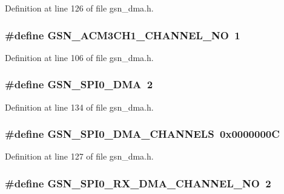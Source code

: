 Definition at line 126 of file gsn\_\-dma.h.

\hypertarget{a00484_a2b2db8ce0a5e10a4826bce61e6b673d5}{
\subsubsection[{GSN\_\-ACM3CH1\_\-CHANNEL\_\-NO}]{\setlength{\rightskip}{0pt plus 5cm}\#define GSN\_\-ACM3CH1\_\-CHANNEL\_\-NO~1}}
\label{a00484_a2b2db8ce0a5e10a4826bce61e6b673d5}


Definition at line 106 of file gsn\_\-dma.h.

\hypertarget{a00484_a90eb18824f9b1b14a6e642364c002099}{
\subsubsection[{GSN\_\-SPI0\_\-DMA}]{\setlength{\rightskip}{0pt plus 5cm}\#define GSN\_\-SPI0\_\-DMA~2}}
\label{a00484_a90eb18824f9b1b14a6e642364c002099}


Definition at line 134 of file gsn\_\-dma.h.

\hypertarget{a00484_a518ed5af9857de8db4ce3248328e9c6b}{
\subsubsection[{GSN\_\-SPI0\_\-DMA\_\-CHANNELS}]{\setlength{\rightskip}{0pt plus 5cm}\#define GSN\_\-SPI0\_\-DMA\_\-CHANNELS~0x0000000C}}
\label{a00484_a518ed5af9857de8db4ce3248328e9c6b}


Definition at line 127 of file gsn\_\-dma.h.

\hypertarget{a00484_a09c49cb5be2c0afcec8a685ed3679134}{
\subsubsection[{GSN\_\-SPI0\_\-RX\_\-DMA\_\-CHANNEL\_\-NO}]{\setlength{\rightskip}{0pt plus 5cm}\#define GSN\_\-SPI0\_\-RX\_\-DMA\_\-CHANNEL\_\-NO~2}}
\label{a00484_a09c49cb5be2c0afcec8a685ed3679134}


